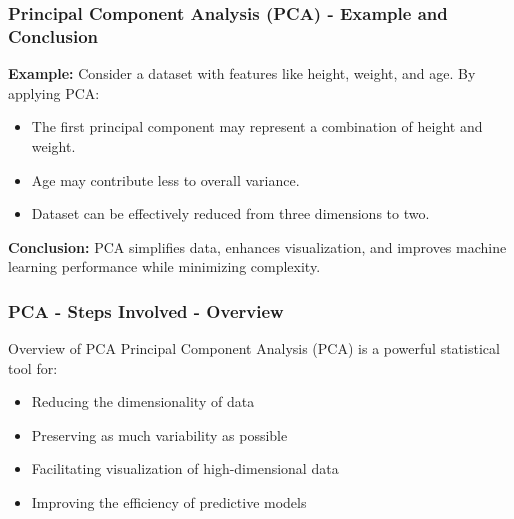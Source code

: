 \documentclass{beamer}
\begin{document}
\begin{frame}[fragile]
    \frametitle{Principal Component Analysis (PCA) - Example and Conclusion}
    \textbf{Example:}
    Consider a dataset with features like height, weight, and age. By applying PCA:
    \begin{itemize}
        \item The first principal component may represent a combination of height and weight.
        \item Age may contribute less to overall variance.
        \item Dataset can be effectively reduced from three dimensions to two.
    \end{itemize}

    \textbf{Conclusion:} PCA simplifies data, enhances visualization, and improves machine learning performance while minimizing complexity.
\end{frame}

\begin{frame}[fragile]
    \frametitle{PCA - Steps Involved - Overview}
    \begin{block}{Overview of PCA}
        Principal Component Analysis (PCA) is a powerful statistical tool for:
        \begin{itemize}
            \item Reducing the dimensionality of data
            \item Preserving as much variability as possible
            \item Facilitating visualization of high-dimensional data
            \item Improving the efficiency of predictive models
        \end{itemize}
    \end{block}
\end{frame}
\end{document}
